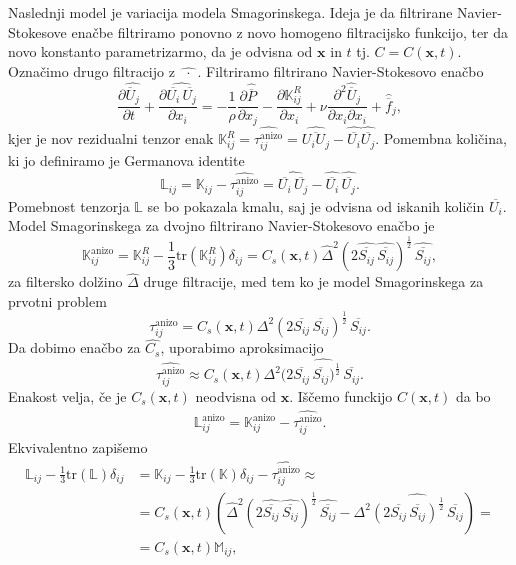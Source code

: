 \documentclass[mat2, tisk]{fmfdelo}
\newcommand{\bd}{\textbf}
\begin{document}
Naslednji model je variacija modela Smagorinskega. Ideja je da 
filtrirane Navier-Stokesove enačbe filtriramo ponovno z novo homogeno
filtracijsko funkcijo, ter da novo konstanto parametrizarmo, da je odvisna od $\bd{x}$ in $t$
tj. $C = C(\bd{x}, t)$. Označimo drugo filtracijo z $\widehat{\,\,\cdot\,\,}$.
Filtriramo filtrirano Navier-Stokesovo enačbo 
$$
\frac{\partial \widehat{\overline{U}_j}}{\partial t} + \frac{\partial \widehat{\overline{U_i}\, \overline{U_j}}}{\partial x_i} = -\frac{1}{\rho} \frac{\partial \hat{\overline{P}}}{\partial x_j} 
- \frac{\partial \mathbb{K}_{ij}^R}{\partial x_i}+ \nu \frac{\partial^2 \widehat{\overline{U}}_j}{\partial x_i \partial x_i} + \hat{\overline{f}}_j,
$$
kjer je nov rezidualni tenzor enak $\mathbb{K}_{ij}^R = \widehat{\tau_{ij}^\text{anizo}} = \widehat{\overline{U_i U_j}} - \widehat{\overline{U_i}} \widehat{\overline{U_j}}$.
Pomembna količina, ki jo definiramo je Germanova identite 
$$
\mathbb{L}_{ij} = \mathbb{K}_{ij} - \widehat{\tau_{ij}^\text{anizo}} = \widehat{\overline{U_i} \,\overline{U_j}} - \widehat{\overline{U_i}}\, \widehat{\overline{U_j}}.
$$
Pomebnost tenzorja $\mathbb{L}$ se bo pokazala kmalu, saj je 
odvisna od iskanih količin $\overline{U_i}$. 
Model Smagorinskega za dvojno filtrirano Navier-Stokesovo enačbo je
$$
\mathbb{K}_{ij}^\text{anizo} = \mathbb{K}_{ij}^R - \frac{1}{3} \text{tr}(\mathbb{K}_{ij}^R) \delta_{ij} = C_s(\bd{x}, t) \widehat{\Delta}^2 (2 \widehat{\overline{S_{ij}}} \,\widehat{\overline{S_{ij}}})^\frac{1}{2} \,\widehat{\overline{S_{ij}}},
$$
za filtersko dolžino $\widehat{\Delta}$ druge filtracije, 
med tem ko je model Smagorinskega za prvotni problem
$$
\tau_{ij}^\text{anizo} = C_s(\bd{x}, t) \Delta^2 (2 \overline{S_{ij}} \,\overline{S_{ij}})^\frac{1}{2} \,\overline{S_{ij}}.
$$
Da dobimo enačbo za $\widehat{C_s}$, uporabimo aproksimacijo 
$$
\widehat{\tau_{ij}^\text{anizo}} \approx C_s(\bd{x}, t) \Delta^2 (\widehat{2 \overline{S_{ij}} \,\overline{S_{ij}})^\frac{1}{2} \,\overline{S_{ij}}}.
$$
Enakost velja, če je $C_s(\bd{x}, t)$ neodvisna od $\bd{x}$. 
Iščemo funckijo $C(\bd{x}, t)$ da bo 
\begin{align*}
\mathbb{L}_{ij}^\text{anizo} = \mathbb{K}_{ij}^\text{anizo} - \widehat{\tau_{ij}^\text{anizo}}.
\end{align*}
Ekvivalentno zapišemo 
\begin{align*}
\mathbb{L}_{ij} - \frac{1}{3}\text{tr}(\mathbb{L}) \delta_{ij} &= \mathbb{K}_{ij} - \frac{1}{3}\text{tr}(\mathbb{K}) \delta_{ij} - \widehat{\tau_{ij}^\text{anizo}} \approx \\
&= C_s(\bd{x}, t)(\widehat{\Delta}^2 (2 \widehat{\overline{S_{ij}}} \,\widehat{\overline{S_{ij}}})^\frac{1}{2} \,\widehat{\overline{S_{ij}}} - \Delta^2 \widehat{(2 \overline{S_{ij}} \,\overline{S_{ij}})^\frac{1}{2} \,\overline{S_{ij}}}) = \\
&= C_s(\bd{x}, t)\mathbb{M}_{ij},
\end{align*}
\end{document}
